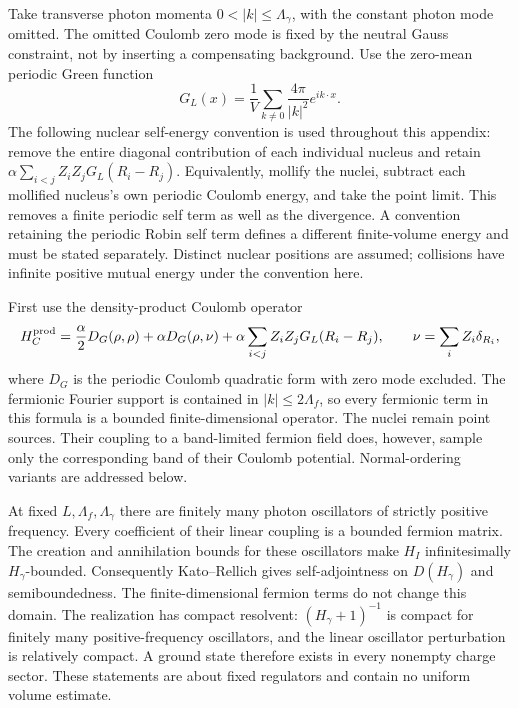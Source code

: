 Take transverse photon momenta $0<|k|\le\Lambda_\gamma$, with the constant
photon mode omitted.  The omitted Coulomb zero mode is fixed by the neutral
Gauss constraint, not by inserting a compensating background.  Use the
zero-mean periodic Green function
\[
 G_L(x)=\frac1V\sum_{k\ne0}\frac{4\pi}{|k|^2}e^{ik\cdot x}.
\]
The following nuclear self-energy convention is used throughout this
appendix: remove the entire diagonal contribution of each individual nucleus
and retain $\alpha\sum_{i<j}Z_iZ_jG_L(R_i-R_j)$.  Equivalently, mollify the
nuclei, subtract each mollified nucleus's own periodic Coulomb energy, and
take the point limit.  This removes a finite periodic self term as well as the
divergence.  A convention retaining the periodic Robin self term defines a
different finite-volume energy and must be stated separately.  Distinct
nuclear positions are assumed; collisions have infinite positive mutual
energy under the convention here.

First use the density-product Coulomb operator
\begin{equation}
 H_C^{\rm prod}
 =\frac\alpha2D_G(\rho,\rho)
   +\alpha D_G(\rho,\nu)
   +\alpha\sum_{i<j}Z_iZ_jG_L(R_i-R_j),
 \qquad \nu=\sum_iZ_i\delta_{R_i},
 \label{app-finite:coulomb-definition}
\end{equation}
where $D_G$ is the periodic Coulomb quadratic form with zero mode excluded.
The fermionic Fourier support is contained in $|k|\le2\Lambda_f$, so every
fermionic term in this formula is a bounded finite-dimensional operator.
The nuclei remain point sources.  Their coupling to a band-limited fermion
field does, however, sample only the corresponding band of their Coulomb
potential.  Normal-ordering variants are addressed below.

At fixed $L,\Lambda_f,\Lambda_\gamma$ there are finitely many photon
oscillators of strictly positive frequency.  Every coefficient of their linear
coupling is a bounded fermion matrix.  The creation and annihilation bounds
for these oscillators make $H_I$ infinitesimally $H_\gamma$-bounded.
Consequently Kato--Rellich gives self-adjointness on $D(H_\gamma)$ and
semiboundedness.  The finite-dimensional fermion terms do not change this
domain.  The realization has compact resolvent: $(H_\gamma+1)^{-1}$ is
compact for finitely many positive-frequency oscillators, and the linear
oscillator perturbation is relatively compact.  A ground state therefore
exists in every nonempty charge sector.  These statements are about fixed
regulators and contain no uniform volume estimate.

